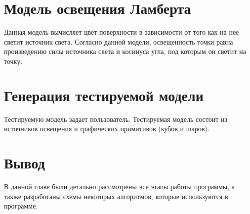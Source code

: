 \section{Модель освещения Ламберта}

Данная модель вычисляет цвет поверхности в зависимости от того как на нее светит источник света. Согласно данной модели, освещенность точки равна произведению силы источника света и косинуса угла, под которым он светит на точку.

\section{Генерация тестируемой модели}

Тестируемую модель задает пользователь. Тестируемая модель состоит из источников освещения и графических примитивов (кубов и шаров).

\section*{Вывод}
В данной главе были детально рассмотрены все этапы работы программы, а также разработаны схемы некоторых алгоритмов, которые используются в программе.

